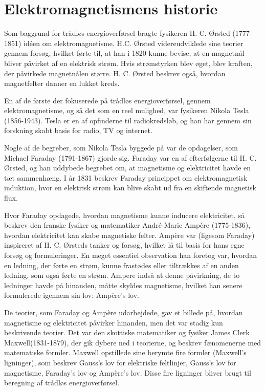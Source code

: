 \section{Elektromagnetismens historie}

Som baggrund for trådløs energioverførsel bragte fysikeren H. C. Ørsted (1777-1851) idéen om elektromagnetisme. \cite{historie2} H.C. Ørsted videreudviklede sine teorier gennem forsøg, hvilket førte til, at han i 1820 kunne bevise, at en magnetnål bliver påvirket af en elektrisk strøm. Hvis strømstyrken blev øget, blev kraften, der påvirkede magnetnålen større. H. C. Ørsted beskrev også, hvordan magnetfelter danner en lukket kreds. \cite{historie1}

En af de første der fokuserede på trådløs energioverførsel, gennem elektromagnetisme, og så det som en reel mulighed, var fysikeren Nikola Tesla (1856-1943). Tesla er en af opfinderne til radiokredsløb, og han har gennem sin forskning skabt basis for radio, TV og internet. \cite{historie3}

Nogle af de begreber, som Nikola Tesla byggede på var de opdagelser, som Michael Faraday (1791-1867) gjorde sig. Faraday var en af efterfølgerne til H. C. Ørsted, og han uddybede begrebet om, at magnetisme og elektricitet havde en tæt sammenhæng. I år 1831 beskrev Faraday princippet om elektromagnetisk induktion, hvor en elektrisk strøm kan blive skabt ud fra en skiftende magnetisk flux. \cite{historie4}

Hvor Faraday opdagede, hvordan magnetisme kunne inducere elektricitet, så beskrev den franske fysiker og matematiker André-Marie Ampère (1775-1836), hvordan elektricitet kan skabe magnetiske felter. Ampère var (ligesom Faraday) inspireret af H. C. Ørsteds tanker og forsøg, hvilket lå til basis for hans egne forsøg og formuleringer. En meget essentiel observation han foretog var, hvordan en ledning, der førte en strøm, kunne frastødes eller tiltrækkes af en anden ledning, som også førte en strøm. \cite{historie5} Ampere indså at denne påvirkning, de to ledninger havde på hinanden, måtte skyldes magnetisme, hvilket han senere formulerede igennem sin lov: Ampère's lov. \cite{historie6}

De teorier, som Faraday og Ampère udarbejdede, gav et billede på, hvordan magnetisme og elektricitet påvirker hinanden, men det var stadig kun beskrivende teorier. Det var den skottiske matematiker og fysiker James Clerk Maxwell(1831-1879), der gik dybere ned i teorierne, og beskrev fænomenerne med matematiske formler. Maxwell opstillede sine berymte fire formler (Maxwell's ligninger), som beskrev Gauss's lov for elektriske feltlinjer, Gauss's lov for magnetisme, Faraday's lov og Ampère's lov. Disse fire ligninger bliver brugt til beregning af trådløs energioverførsel. \cite{historie7}

\newpage